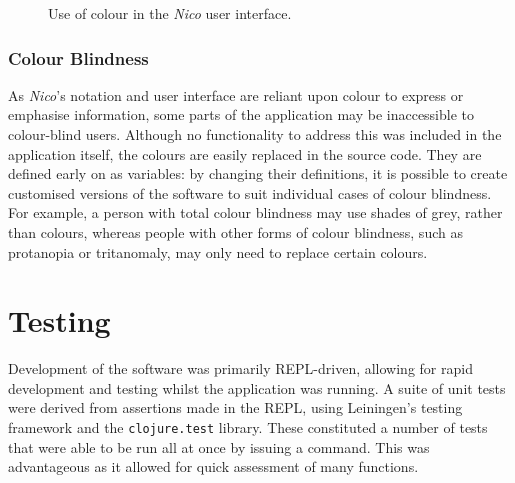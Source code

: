 \documentclass[12pt,twoside,notitlepage,xetex]{report}
\begin{document}
\begin{center}
\begin{figure}[H]
\begin{center}
{}\hspace{2cm}
\end{center}
\caption{Use of colour in the \emph{Nico} user interface.}
\label{fig:ColourCoding}
\end{figure}
\end{center}

\subsubsection{Colour Blindness}

As \emph{Nico}'s notation and user interface are reliant upon colour to express or emphasise information,  some parts of the application may be inaccessible to colour-blind users.  Although no functionality to address this was included in the application itself, the colours are easily replaced in the source code.  They are defined early on as variables: by changing their definitions, it is possible to create customised versions of the software to suit individual cases of colour blindness.  For example, a person with total colour blindness may use shades of grey, rather than colours, whereas people with other forms of colour blindness, such as protanopia or tritanomaly, may only need to replace certain colours.%

\section{Testing}

Development of the software was primarily REPL-driven, allowing for rapid development and testing whilst the application was running.  A suite of unit tests were derived from assertions made in the REPL, using Leiningen's testing framework and the \verb¬clojure.test¬ library.  These constituted a number of tests that were able to be run all at once by issuing a command.  This was advantageous as it allowed for quick assessment of many functions.
\end{document}
